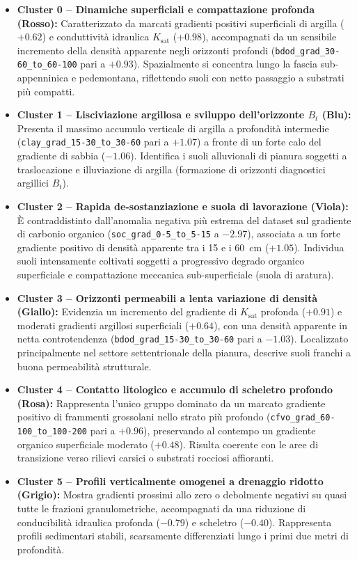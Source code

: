 \documentclass[a4paper,12pt]{article}
\begin{document}
\begin{itemize}
    \item \textbf{Cluster 0 -- Dinamiche superficiali e compattazione profonda (Rosso):} 
    Caratterizzato da marcati gradienti positivi superficiali di argilla ($+0.62$) e conduttività idraulica $K_{\text{sat}}$ ($+0.98$), accompagnati da un sensibile incremento della densità apparente negli orizzonti profondi (\texttt{bdod\_grad\_30-60\_to\_60-100} pari a $+0.93$). Spazialmente si concentra lungo la fascia sub-appenninica e pedemontana, riflettendo suoli con netto passaggio a substrati più compatti.

    \item \textbf{Cluster 1 -- Lisciviazione argillosa e sviluppo dell'orizzonte $B_t$ (Blu):} 
    Presenta il massimo accumulo verticale di argilla a profondità intermedie \\(\texttt{clay\_grad\_15-30\_to\_30-60} pari a $+1.07$) a fronte di un forte calo del gradiente di sabbia ($-1.06$). Identifica i suoli alluvionali di pianura soggetti a traslocazione e illuviazione di argilla (formazione di orizzonti diagnostici argillici $B_t$).

    \item \textbf{Cluster 2 -- Rapida de-sostanziazione e suola di lavorazione (Viola):} 
    È contraddistinto dall'anomalia negativa più estrema del dataset sul gradiente di carbonio organico (\texttt{soc\_grad\_0-5\_to\_5-15} a $-2.97$), associata a un forte gradiente positivo di densità apparente tra i 15 e i 60~cm ($+1.05$). Individua suoli intensamente coltivati soggetti a progressivo degrado organico superficiale e compattazione meccanica sub-superficiale (suola di aratura).

    \item \textbf{Cluster 3 -- Orizzonti permeabili a lenta variazione di densità (Giallo):} 
    Evidenzia un incremento del gradiente di $K_{\text{sat}}$ profonda ($+0.91$) e moderati gradienti argillosi superficiali ($+0.64$), con una densità apparente in netta controtendenza (\texttt{bdod\_grad\_15-30\_to\_30-60} pari a $-1.03$). Localizzato principalmente nel settore settentrionale della pianura, descrive suoli franchi a buona permeabilità strutturale.

    \item \textbf{Cluster 4 -- Contatto litologico e accumulo di scheletro profondo (Rosa):} 
    Rappresenta l'unico gruppo dominato da un marcato gradiente positivo di frammenti grossolani nello strato più profondo (\texttt{cfvo\_grad\_60-100\_to\_100-200} pari a $+0.96$), preservando al contempo un gradiente organico superficiale moderato ($+0.48$). Risulta coerente con le aree di transizione verso rilievi carsici o substrati rocciosi affioranti.

    \item \textbf{Cluster 5 -- Profili verticalmente omogenei a drenaggio ridotto (Grigio):} 
    Mostra gradienti prossimi allo zero o debolmente negativi su quasi tutte le frazioni granulometriche, accompagnati da una riduzione di conducibilità idraulica profonda ($-0.79$) e scheletro ($-0.40$). Rappresenta profili sedimentari stabili, scarsamente differenziati lungo i primi due metri di profondità.
\end{itemize}
\end{document}
